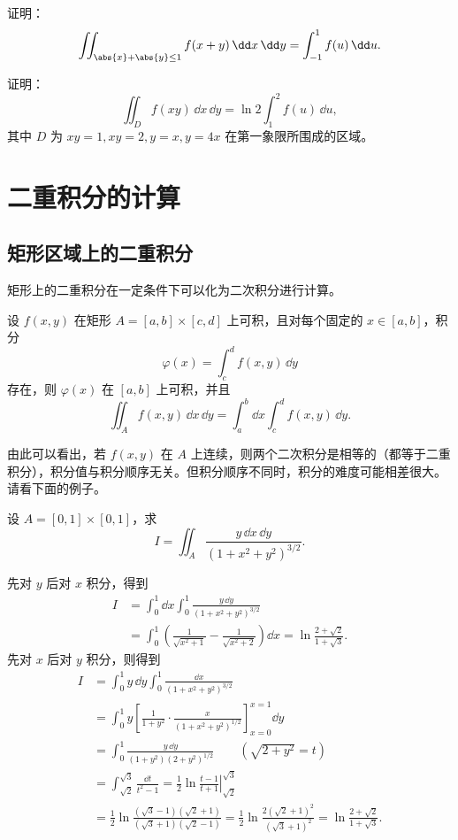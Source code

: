 \begin{xexercise}[3]
证明：
  \[
    \iint_{\abs{x}+\abs{y}\le1} f(x+y)\,\dd x\,\dd y
    =\int_{-1}^1 f(u)\,\dd u.
  \]
\end{xexercise}

\begin{xexercise}[4]
证明：
  \[
    \iint_D f(xy)\,\dd x\,\dd y=\ln2\int_1^2 f(u)\,\dd u,
  \]
  其中 $D$ 为 $xy=1,xy=2,y=x,y=4x$ 在第一象限所围成的区域。
\end{xexercise}

\section{二重积分的计算}

\subsection{矩形区域上的二重积分}

矩形上的二重积分在一定条件下可以化为二次积分进行计算。

设 $f(x,y)$ 在矩形 $A=[a,b]\times[c,d]$ 上可积，且对每个固定的 $x\in[a,b]$，积分
\[
  \varphi(x)=\int_c^d f(x,y)\,\dd y
\]
存在，则 $\varphi(x)$ 在 $[a,b]$ 上可积，并且
\[
  \iint_A f(x,y)\,\dd x\,\dd y
  =\int_a^b\dd x\int_c^d f(x,y)\,\dd y.
\]

由此可以看出，若 $f(x,y)$ 在 $A$ 上连续，则两个二次积分是相等的（都等于二重积分），积分值与积分顺序无关。但积分顺序不同时，积分的难度可能相差很大。请看下面的例子。

\begin{xexample}[22.2.1]
设 $A=[0,1]\times[0,1]$，求
\[
  I=\iint_A\frac{y\,\dd x\,\dd y}{(1+x^2+y^2)^{3/2}}.
\]
\end{xexample}
\begin{xsolution}
先对 $y$ 后对 $x$ 积分，得到
\begin{align*}
  I&=\int_0^1\dd x\int_0^1\frac{y\,\dd y}{(1+x^2+y^2)^{3/2}}\\
   &=\int_0^1\left(\frac1{\sqrt{x^2+1}}-\frac1{\sqrt{x^2+2}}\right)\dd x
   =\ln\frac{2+\sqrt2}{1+\sqrt3}.
\end{align*}
先对 $x$ 后对 $y$ 积分，则得到
\begin{align*}
  I&=\int_0^1 y\,\dd y\int_0^1\frac{\dd x}{(1+x^2+y^2)^{3/2}}\\
   &=\int_0^1 y\left[\frac1{1+y^2}\cdot\frac{x}{(1+x^2+y^2)^{1/2}}\right]_{x=0}^{x=1}\dd y\\
   &=\int_0^1\frac{y\,\dd y}{(1+y^2)(2+y^2)^{1/2}}\qquad(\sqrt{2+y^2}=t)\\
   &=\int_{\sqrt2}^{\sqrt3}\frac{\dd t}{t^2-1}
   =\frac12\ln\left.\frac{t-1}{t+1}\right|_{\sqrt2}^{\sqrt3}\\
   &=\frac12\ln\frac{(\sqrt3-1)(\sqrt2+1)}{(\sqrt3+1)(\sqrt2-1)}
   =\frac12\ln\frac{2(\sqrt2+1)^2}{(\sqrt3+1)^2}
   =\ln\frac{2+\sqrt2}{1+\sqrt3}.
\end{align*}
\end{xsolution}

